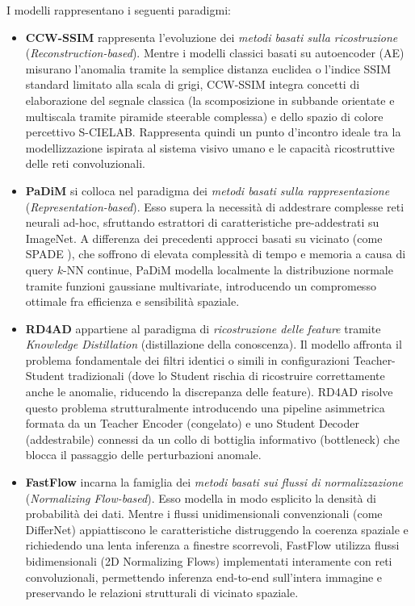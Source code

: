 I modelli rappresentano i seguenti paradigmi:
\begin{itemize}
    \item \textbf{CCW-SSIM} \cite{Berasi_2023} rappresenta l'evoluzione dei \textit{metodi basati sulla ricostruzione} (\textit{Reconstruction-based}). Mentre i modelli classici basati su autoencoder (AE) misurano l'anomalia tramite la semplice distanza euclidea o l'indice SSIM standard limitato alla scala di grigi, CCW-SSIM integra concetti di elaborazione del segnale classica (la scomposizione in subbande orientate e multiscala tramite piramide steerable complessa) e dello spazio di colore percettivo S-CIELAB. Rappresenta quindi un punto d'incontro ideale tra la modellizzazione ispirata al sistema visivo umano e le capacità ricostruttive delle reti convoluzionali.
    
    \item \textbf{PaDiM} \cite{Defard_et_al._2021} si colloca nel paradigma dei \textit{metodi basati sulla rappresentazione} (\textit{Representation-based}). Esso supera la necessità di addestrare complesse reti neurali ad-hoc, sfruttando estrattori di caratteristiche pre-addestrati su ImageNet. A differenza dei precedenti approcci basati su vicinato (come SPADE \cite{Yang_et_al._2021}), che soffrono di elevata complessità di tempo e memoria a causa di query $k$-NN continue, PaDiM modella localmente la distribuzione normale tramite funzioni gaussiane multivariate, introducendo un compromesso ottimale fra efficienza e sensibilità spaziale.
    
    \item \textbf{RD4AD} \cite{Deng_et_al._2022} appartiene al paradigma di \textit{ricostruzione delle feature} tramite \textit{Knowledge Distillation} (distillazione della conoscenza). Il modello affronta il problema fondamentale dei filtri identici o simili in configurazioni Teacher-Student tradizionali (dove lo Student rischia di ricostruire correttamente anche le anomalie, riducendo la discrepanza delle feature). RD4AD risolve questo problema strutturalmente introducendo una pipeline asimmetrica formata da un Teacher Encoder (congelato) e uno Student Decoder (addestrabile) connessi da un collo di bottiglia informativo (bottleneck) che blocca il passaggio delle perturbazioni anomale.
    
    \item \textbf{FastFlow} \cite{Yu_et_al._2021} incarna la famiglia dei \textit{metodi basati sui flussi di normalizzazione} (\textit{Normalizing Flow-based}). Esso modella in modo esplicito la densità di probabilità dei dati. Mentre i flussi unidimensionali convenzionali (come DifferNet) appiattiscono le caratteristiche distruggendo la coerenza spaziale e richiedendo una lenta inferenza a finestre scorrevoli, FastFlow utilizza flussi bidimensionali (2D Normalizing Flows) implementati interamente con reti convoluzionali, permettendo inferenza end-to-end sull'intera immagine e preservando le relazioni strutturali di vicinato spaziale.
\end{itemize}

